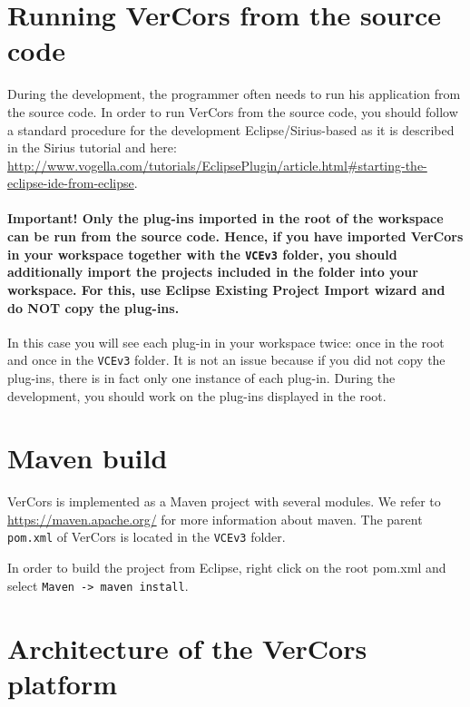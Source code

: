 \documentclass[12pt]{article}
\begin{document}
\section{Running VerCors from the source code}

During the development, the programmer often needs to run his application from the source code. In order to run VerCors from the source code, you should follow a standard procedure for the development Eclipse/Sirius-based as it is described in the Sirius tutorial and here: \url{http://www.vogella.com/tutorials/EclipsePlugin/article.html#starting-the-eclipse-ide-from-eclipse}.

\paragraph{Important! Only the plug-ins imported in the root of the workspace can be run from the source code. Hence, if you have imported VerCors in your workspace together with the \texttt{VCEv3} folder, you should additionally import the projects included in the folder into your workspace. For this, use Eclipse Existing Project Import wizard and do NOT copy the plug-ins.} In this case you will see each plug-in in your workspace twice: once in the root and once in the \texttt{VCEv3} folder. It is not an issue because if you did not copy the plug-ins, there is in fact only one instance of each plug-in. During the development, you should   work on the plug-ins displayed in the root.

\section{Maven build}

VerCors is implemented as a Maven project with several modules. We refer to \url{https://maven.apache.org/} for more information about maven.
The parent \texttt{pom.xml} of VerCors is located in the \texttt{VCEv3} folder.

In order to build the project from Eclipse, right click on the root pom.xml and select \texttt{Maven -> maven install}.

\section{Architecture of the VerCors platform}
\end{document}
